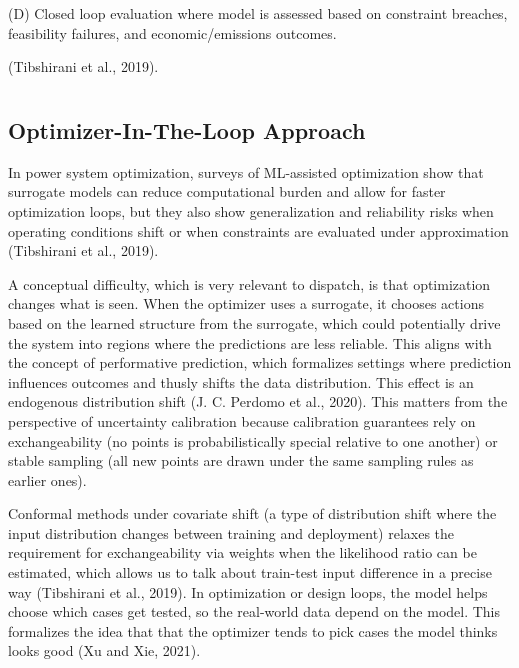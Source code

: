 \documentclass[11pt]{article}
\begin{document}
(D) Closed loop evaluation where model is assessed based on constraint
breaches, feasibility failures, and economic/emissions outcomes.

(Tibshirani et al., 2019).

\section{}\label{section-5}

\subsection{Optimizer-In-The-Loop
Approach}\label{optimizer-in-the-loop-approach}

In power system optimization, surveys of ML-assisted optimization show
that surrogate models can reduce computational burden and allow for
faster optimization loops, but they also show generalization and
reliability risks when operating conditions shift or when constraints
are evaluated under approximation (Tibshirani et al., 2019).

A conceptual difficulty, which is very relevant to dispatch, is that
optimization changes what is seen. When the optimizer uses a surrogate,
it chooses actions based on the learned structure from the surrogate,
which could potentially drive the system into regions where the
predictions are less reliable. This aligns with the concept of
performative prediction, which formalizes settings where prediction
influences outcomes and thusly shifts the data distribution. This effect
is an endogenous distribution shift (J. C. Perdomo et al., 2020). This
matters from the perspective of uncertainty calibration because
calibration guarantees rely on exchangeability (no points is
probabilistically special relative to one another) or stable sampling
(all new points are drawn under the same sampling rules as earlier
ones).

Conformal methods under covariate shift (a type of distribution shift
where the input distribution changes between training and deployment)
relaxes the requirement for exchangeability via weights when the
likelihood ratio can be estimated, which allows us to talk about
train-test input difference in a precise way (Tibshirani et al., 2019).
In optimization or design loops, the model helps choose which cases get
tested, so the real-world data depend on the model. This formalizes the
idea that that the optimizer tends to pick cases the model thinks looks
good (Xu and Xie, 2021).
\end{document}
